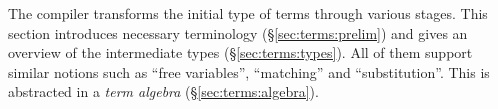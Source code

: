
\noindent
The compiler transforms the initial type of terms through various stages.
This section introduces necessary terminology (§\ref{sec:terms:prelim}) and gives an overview of the intermediate types (§\ref{sec:terms:types}).
All of them support similar notions such as ``free variables'', ``matching'' and ``substitution''.
This is abstracted in a \emph{term algebra} (§\ref{sec:terms:algebra}).